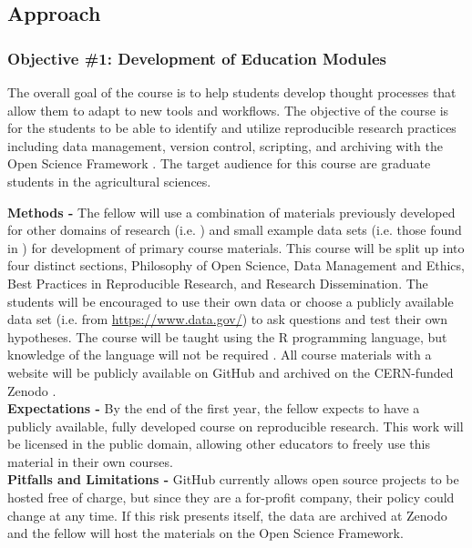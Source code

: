 \documentclass[12pt,letterpaper]{article}
\begin{document}
\subsection{Approach}


\subsubsection*{Objective \#1: Development of Education Modules}

The overall goal of the course is to help students develop thought processes that allow them to adapt to new tools and workflows. 
The objective of the course is for the students to be able to identify and utilize reproducible research practices including data management, version control, scripting, and archiving with the Open Science Framework \citep{nosek2017osf}.
The target audience for this course are graduate students in the agricultural sciences.

\noindent \textbf{Methods -} 
The fellow will use a combination of materials previously developed for other domains of research (i.e. \citet{broman}) and small example data sets (i.e. those found in \citet{sparks2008ecology}) for development of primary course materials. 
This course will be split up into four distinct sections, Philosophy of Open Science, Data Management and Ethics, Best Practices in Reproducible Research, and Research Dissemination.
The students will be encouraged to use their own data or choose a publicly available data set (i.e. from \url{https://www.data.gov/}) to ask questions and test their own hypotheses.
The course will be taught using the R programming language, but knowledge of the language will not be required \citep{R2017}.
All course materials with a website will be publicly available on GitHub and archived on the CERN-funded Zenodo \citep{nielsen2017zenodo}.\\
\noindent \textbf{Expectations -}
By the end of the first year, the fellow expects to have a publicly available, fully developed course on reproducible research.
This work will be licensed in the public domain, allowing other educators to freely use this material in their own courses.\\
\noindent \textbf{Pitfalls and Limitations -}
GitHub currently allows open source projects to be hosted free of charge, but since they are a for-profit company, their policy could change at any time. If this risk presents itself, the data are archived at Zenodo and the fellow will host the materials on the Open Science Framework.
\end{document}

